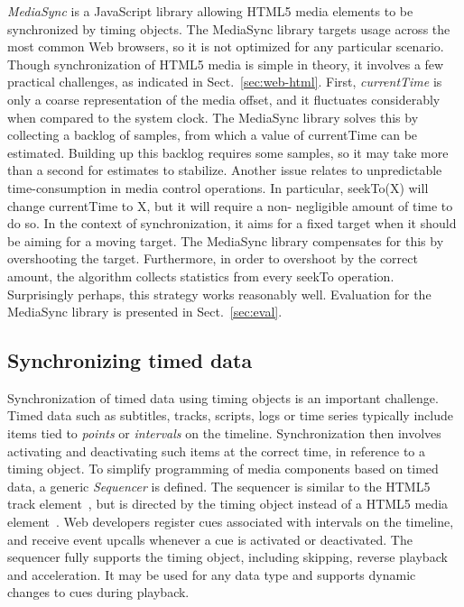 \emph{MediaSync} is a JavaScript library allowing HTML5 media elements to be
synchronized by timing objects. The MediaSync library targets usage across the
most common Web browsers, so it is not optimized for any particular scenario.
Though synchronization of HTML5 media is simple in theory, it involves a few
practical challenges, as indicated in Sect.~\ref{sec:web-html}. First,
\emph{currentTime} is only a coarse representation of the media offset, and it
fluctuates considerably when compared to the system clock. The MediaSync
library solves this by collecting a backlog of samples, from which a value of
currentTime can be estimated. Building up this backlog requires some samples,
so it may take more than a second for estimates to stabilize. Another issue
relates to unpredictable time-consumption in media control operations. In
particular, seekTo(X) will change currentTime to X, but it will require a non-
negligible amount of time to do so. In the context of synchronization, it aims
for a fixed target when it should be aiming for a moving target. The MediaSync
library compensates for this by overshooting the target. Furthermore, in order
to overshoot by the correct amount, the algorithm collects statistics from
every seekTo operation. Surprisingly perhaps, this strategy works reasonably
well. Evaluation for the MediaSync library is presented in Sect.~\ref{sec:eval}.


\subsection{Synchronizing timed data}
\label{sec:sequencer}

Synchronization of timed data using timing objects is an important challenge.
Timed data such as subtitles, tracks, scripts, logs or time series typically
include items tied to \emph{points} or \emph{intervals} on the timeline.
Synchronization then involves activating and deactivating such items at the
correct time, in reference to a timing object. To simplify programming of
media components based on timed data, a generic \emph{Sequencer} is defined.
The sequencer is similar to the HTML5 track element~\cite{html5track}, but is
directed by the timing object instead of a HTML5 media
element~\cite{html5media}. Web developers register cues associated with
intervals on the timeline, and receive event upcalls whenever a cue is
activated or deactivated. The sequencer fully supports the timing object,
including skipping, reverse playback and acceleration. It may be used for any
data type and supports dynamic changes to cues during playback.


